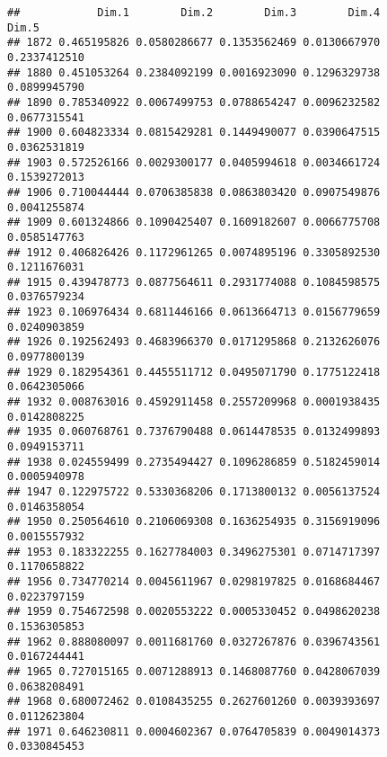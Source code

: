 \documentclass[
]{article}
\newenvironment{Shaded}{\begin{snugshade}}{\end{snugshade}}
\newcommand{\NormalTok}[1]{#1}
\newcommand{\SpecialCharTok}[1]{\textcolor[rgb]{0.00,0.00,0.00}{#1}}
\begin{document}
\begin{verbatim}
##            Dim.1        Dim.2        Dim.3        Dim.4        Dim.5
## 1872 0.465195826 0.0580286677 0.1353562469 0.0130667970 0.2337412510
## 1880 0.451053264 0.2384092199 0.0016923090 0.1296329738 0.0899945790
## 1890 0.785340922 0.0067499753 0.0788654247 0.0096232582 0.0677315541
## 1900 0.604823334 0.0815429281 0.1449490077 0.0390647515 0.0362531819
## 1903 0.572526166 0.0029300177 0.0405994618 0.0034661724 0.1539272013
## 1906 0.710044444 0.0706385838 0.0863803420 0.0907549876 0.0041255874
## 1909 0.601324866 0.1090425407 0.1609182607 0.0066775708 0.0585147763
## 1912 0.406826426 0.1172961265 0.0074895196 0.3305892530 0.1211676031
## 1915 0.439478773 0.0877564611 0.2931774088 0.1084598575 0.0376579234
## 1923 0.106976434 0.6811446166 0.0613664713 0.0156779659 0.0240903859
## 1926 0.192562493 0.4683966370 0.0171295868 0.2132626076 0.0977800139
## 1929 0.182954361 0.4455511712 0.0495071790 0.1775122418 0.0642305066
## 1932 0.008763016 0.4592911458 0.2557209968 0.0001938435 0.0142808225
## 1935 0.060768761 0.7376790488 0.0614478535 0.0132499893 0.0949153711
## 1938 0.024559499 0.2735494427 0.1096286859 0.5182459014 0.0005940978
## 1947 0.122975722 0.5330368206 0.1713800132 0.0056137524 0.0146358054
## 1950 0.250564610 0.2106069308 0.1636254935 0.3156919096 0.0015557932
## 1953 0.183322255 0.1627784003 0.3496275301 0.0714717397 0.1170658822
## 1956 0.734770214 0.0045611967 0.0298197825 0.0168684467 0.0223797159
## 1959 0.754672598 0.0020553222 0.0005330452 0.0498620238 0.1536305853
## 1962 0.888080097 0.0011681760 0.0327267876 0.0396743561 0.0167244441
## 1965 0.727015165 0.0071288913 0.1468087760 0.0428067039 0.0638208491
## 1968 0.680072462 0.0108435255 0.2627601260 0.0039393697 0.0112623804
## 1971 0.646230811 0.0004602367 0.0764705839 0.0049014373 0.0330845453
\end{verbatim}

\begin{Shaded}
\end{Shaded}
\end{document}
